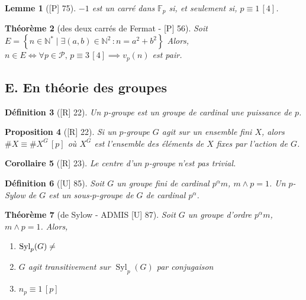 \documentclass[10pt, a4paper, parskip=full, twoside, twocolumn]{report}
\newtheorem{definition}{Définition}
\newtheorem{theorem}[definition]{Théorème}
\newtheorem{proposition}[definition]{Proposition}
\newtheorem{lemma}[definition]{Lemme}
\newtheorem{corollary}[definition]{Corollaire}
\newcommand{\IN}{\mathbb{N}}
\newcommand{\IF}{\mathbb{F}}
\DeclareMathOperator{\Syl}{Syl}
\begin{document}
\begin{tcolorbox}[
    breakable, %
    colback=developpement, %
    colframe=gray!0!black, %
    boxrule=0pt, %
    arc=1mm, %
	boxsep=0pt,
	left=0pt, right=0pt, top=0pt, bottom=0pt
]
\begin{lemma}[\textnormal{[P] 75}]
	\label{121dev11}
	$-1$ est un carré dans $\IF_p$ si, et seulement si, $p\equiv 1\,[4]$.
\end{lemma}

\begin{theorem}[des deux carrés de Fermat - \textnormal{[P] 56}]
	\label{121dev12}
	Soit $E = \left\{n\in\IN^* \mid \exists (a,b)\in\IN^2\,\colon n = a^2 + b^2 \right\}$
	Alors, $n\in E \iff \forall p\in\mathcal{P},\, p\equiv 3\,[4] \implies v_p(n)$ est pair.
\end{theorem}
\end{tcolorbox}

\subsection*{E. En théorie des groupes}
\begin{definition}[\textnormal{[R] 22}]
	Un $p$-groupe est un groupe de cardinal une puissance de $p$.
\end{definition}

\begin{proposition}[\textnormal{[R] 22}]
	Si un $p$-groupe $G$ agit sur un ensemble fini $X$, alors $\# X \equiv \#X^G\,[p]$
	où $X^G$ est l'ensemble des éléments de $X$ fixes par l'action de $G$.
\end{proposition}

\begin{corollary}[\textnormal{[R] 23}]
	Le centre d'un $p$-groupe n'est pas trivial.
\end{corollary}

\begin{definition}[\textnormal{[U] 85}]
	Soit $G$ un groupe fini de cardinal $p^{\alpha}m$, $m\wedge p=1$. Un $p$-Sylow de $G$
	est un sous-$p$-groupe de $G$ de cardinal $p^{\alpha}$.
\end{definition}

\begin{theorem}[de Sylow - ADMIS \textnormal{[U] 87}]Soit $G$ un groupe d'ordre $p^{\alpha}m$, $m\wedge p = 1$. Alors,
	\begin{enumerate}
		\item $\Syl_p(G)\neq \empty$
		\item $G$ agit transitivement sur $\Syl_p(G)$ par conjugaison
		\item $n_p\equiv 1\, [p]$
	\end{enumerate}
\end{theorem}
\end{document}
